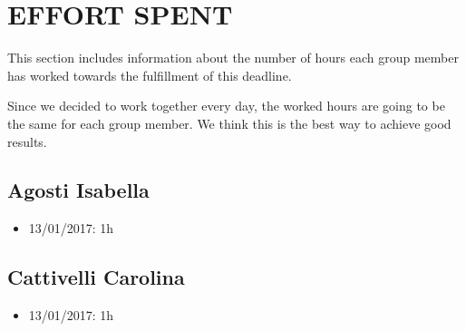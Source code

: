 \section{EFFORT SPENT}
This section includes information about the number of hours each group member has worked towards the fulfillment of this deadline. 

Since we decided to work together every day, the worked hours are going to be the same for each group member. We think this is the best way to achieve good results.  

\subsection{Agosti Isabella}
\begin{itemize}
	\item 13/01/2017: 1h
\end{itemize}
\subsection{Cattivelli Carolina}
\begin{itemize}
	\item 13/01/2017: 1h
\end{itemize}